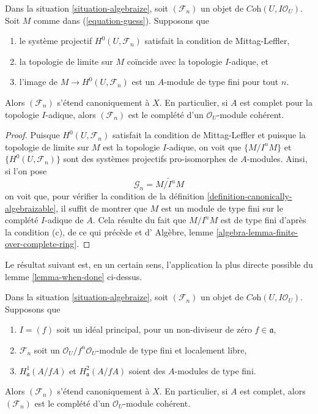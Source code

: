 \begin{lemma}
\label{lemma-when-done}
Dans la situation \ref{situation-algebraize}, soit $(\mathcal{F}_n)$ un objet
de $\textit{Coh}(U, I\mathcal{O}_U)$. Soit $M$ comme dans (\ref{equation-guess}).
Supposons que
\begin{enumerate}
\item[(a)] le système projectif $H^0(U, \mathcal{F}_n)$ satisfait la condition de Mittag-Leffler,
\item[(b)] la topologie de limite sur $M$ coïncide avec la topologie $I$-adique, et
\item[(c)] l'image de $M \to H^0(U, \mathcal{F}_n)$ est un $A$-module de type fini
pour tout $n$.
\end{enumerate}
Alors $(\mathcal{F}_n)$ s'étend canoniquement à $X$.
En particulier, si $A$ est complet pour la topologie $I$-adique, alors
$(\mathcal{F}_n)$ est le complété d'un $\mathcal{O}_U$-module cohérent.
\end{lemma}

\begin{proof}
Puisque $H^0(U, \mathcal{F}_n)$ satisfait la condition de Mittag-Leffler
et puisque la topologie de limite sur $M$ est la topologie $I$-adique,
on voit que $\{M/I^nM\}$ et $\{H^0(U, \mathcal{F}_n)\}$
sont des systèmes projectifs pro-isomorphes de $A$-modules.
Ainsi, si l'on pose
$$
\mathcal{G}_n = \widetilde{M/I^n M}
$$
on voit que, pour vérifier la condition de la
définition \ref{definition-canonically-algebraizable},
il suffit de montrer que $M$ est un module de type fini sur le
complété $I$-adique de $A$. Cela résulte
du fait que $M/I^n M$ est de type fini d'après la condition (c),
de ce qui précède et d'
Algèbre, lemme \ref{algebra-lemma-finite-over-complete-ring}.
\end{proof}

\noindent
Le résultat suivant est, en un certain sens, l'application la plus directe possible du
lemme \ref{lemma-when-done} ci-dessus.

\begin{lemma}
\label{lemma-algebraization-principal-variant}
Dans la situation \ref{situation-algebraize}, soit
$(\mathcal{F}_n)$ un objet de $\textit{Coh}(U, I\mathcal{O}_U)$.
Supposons que
\begin{enumerate}
\item $I = (f)$ soit un idéal principal, pour un non-diviseur de zéro $f \in \mathfrak a$,
\item $\mathcal{F}_n$ soit un
$\mathcal{O}_U/f^n\mathcal{O}_U$-module de type fini et localement libre,
\item $H^1_\mathfrak a(A/fA)$ et $H^2_\mathfrak a(A/fA)$
soient des $A$-modules de type fini.
\end{enumerate}
Alors $(\mathcal{F}_n)$ s'étend canoniquement à $X$. En particulier, si $A$
est complet, alors $(\mathcal{F}_n)$ est le complété d'un
$\mathcal{O}_U$-module cohérent.
\end{lemma}

